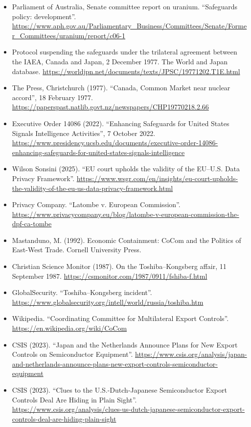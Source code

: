 \documentclass[11pt]{article}
\begin{document}
\begin{itemize}[leftmargin=1.5em, itemindent=-1.5em, label={}, itemsep=2pt]
\item Parliament of Australia, Senate committee report on uranium. ``Safeguards policy: development''. \url{https://www.aph.gov.au/Parliamentary_Business/Committees/Senate/Former_Committees/uranium/report/c06-1}
\item Protocol suspending the safeguards under the trilateral agreement between the IAEA, Canada and Japan, 2 December 1977. The World and Japan database. \url{https://worldjpn.net/documents/texts/JPSC/19771202.T1E.html}
\item The Press, Christchurch (1977). ``Canada, Common Market near nuclear accord'', 18 February 1977. \url{https://paperspast.natlib.govt.nz/newspapers/CHP19770218.2.66}
\item Executive Order 14086 (2022). ``Enhancing Safeguards for United States Signals Intelligence Activities'', 7 October 2022. \url{https://www.presidency.ucsb.edu/documents/executive-order-14086-enhancing-safeguards-for-united-states-signals-intelligence}
\item Wilson Sonsini (2025). ``EU court upholds the validity of the EU--U.S. Data Privacy Framework''. \url{https://www.wsgr.com/en/insights/eu-court-upholds-the-validity-of-the-eu-us-data-privacy-framework.html}
\item Privacy Company. ``Latombe v. European Commission''. \url{https://www.privacycompany.eu/blog/latombe-v-european-commission-the-dpf-ca-tombe}
\item Mastanduno, M. (1992). Economic Containment: CoCom and the Politics of East-West Trade. Cornell University Press.
\item Christian Science Monitor (1987). On the Toshiba--Kongsberg affair, 11 September 1987. \url{https://csmonitor.com/1987/0911/fshiba-f.html}
\item GlobalSecurity. ``Toshiba--Kongsberg incident''. \url{https://www.globalsecurity.org/intell/world/russia/toshiba.htm}
\item Wikipedia. ``Coordinating Committee for Multilateral Export Controls''. \url{https://en.wikipedia.org/wiki/CoCom}
\item CSIS (2023). ``Japan and the Netherlands Announce Plans for New Export Controls on Semiconductor Equipment''. \url{https://www.csis.org/analysis/japan-and-netherlands-announce-plans-new-export-controls-semiconductor-equipment}
\item CSIS (2023). ``Clues to the U.S.-Dutch-Japanese Semiconductor Export Controls Deal Are Hiding in Plain Sight''. \url{https://www.csis.org/analysis/clues-us-dutch-japanese-semiconductor-export-controls-deal-are-hiding-plain-sight}

\end{itemize}
\end{document}
